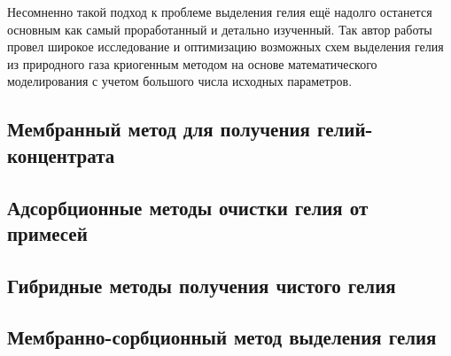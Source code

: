 Несомненно такой подход к проблеме выделения гелия ещё надолго останется основным как самый проработанный и детально изученный. Так автор работы \cite{Stepanov_Avtoreferat} провел широкое исследование и оптимизацию возможных схем выделения гелия из природного газа криогенным методом на основе математического моделирования с учетом большого числа исходных параметров. 

\subsection{Мембранный метод для получения гелий-концентрата} \label{section_1_1_2}

\subsection{Адсорбционные методы очистки гелия от примесей} \label{section_1_1_3}

\subsection{Гибридные методы получения чистого гелия} \label{section_1_1_4}

\subsection{Мембранно-сорбционный метод выделения гелия} \label{section_1_1_5}
